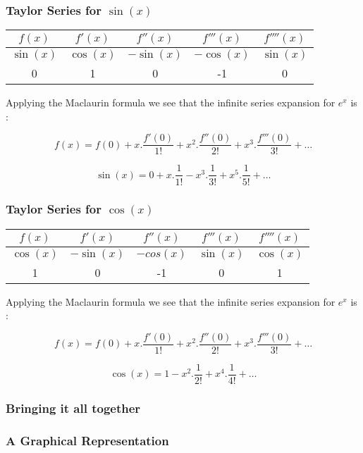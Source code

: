 \documentclass[10pt]{beamer}
\begin{document}
\begin{frame}
	\frametitle{Taylor Series for $\sin(x)$}
	\begin{center}
		\begin{tabular}{|c|c|c|c|c|}
			\hline
			\(f(x)\)    & \(f'(x)\)   & \(f''(x)\)   & \(f'''(x)\)  & \(f''''(x)\) \\
			\hline
			\(\sin(x)\) & \(\cos(x)\) & \(-\sin(x)\) & \(-\cos(x)\) & \(\sin(x)\)  \\
			\hline
			0           & 1           & 0            & -1           & 0            \\
			\hline
		\end{tabular}
	\end{center}
	\vspace{20pt}
	Applying the Maclaurin formula we see that the infinite series expansion for $e^x$ is :

	\large $$f(x) = f(0)+x.\dfrac{f'(0)}{1!}+ x^2.\dfrac{f''(0)}{2!} +x^3.\dfrac{f'''(0)}{3!} + \dots$$

	\large $$\sin(x) = 0+x.\dfrac{1}{1!} -x^3.\dfrac{1}{3!} + x^5.\dfrac{1}{5!} +\dots$$

\end{frame}

\begin{frame}
	\frametitle{Taylor Series for $\cos(x)$}
	\begin{center}
		\begin{tabular}{|c|c|c|c|c|}
			\hline
			$f(x)$    & $f'(x)$    & $f''(x)$  & $f'''(x)$ & $f''''(x)$ \\
			\hline
			$\cos(x)$ & $-\sin(x)$ & $-cos(x)$ & $\sin(x)$ & $\cos(x)$  \\
			\hline
			1         & 0          & -1        & 0         & 1          \\
			\hline
		\end{tabular}
	\end{center}
	\vspace{20pt}
	Applying the Maclaurin formula we see that the infinite series expansion for $e^x$ is :

	\large $$f(x) = f(0)+x.\dfrac{f'(0)}{1!}+ x^2.\dfrac{f''(0)}{2!} +x^3.\dfrac{f'''(0)}{3!} + \dots$$

	\large $$\cos(x) = 1- x^2.\dfrac{1}{2!} +x^4.\dfrac{1}{4!} + \dots$$

\end{frame}

\begin{frame}
	\frametitle{Bringing it all together}
\end{frame}

\begin{frame}
	\frametitle{A Graphical Representation}
\end{frame}
\end{document}
